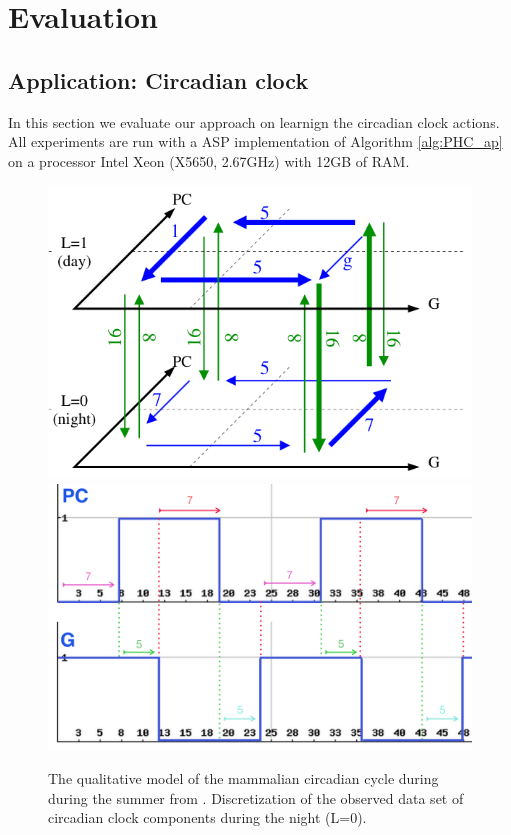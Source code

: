 \section{Evaluation}
\label{sec:evaluation}
\subsection{Application: Circadian clock}

In this section we evaluate our approach on learnign the circadian clock actions.
All experiments are run with a ASP implementation of Algorithm \ref{alg:PHC_ap} on a processor Intel Xeon (X5650, 2.67GHz) with 12GB of RAM.

\begin{figure}
\begin{center}
\includegraphics[width=0.4\linewidth]{images/circadianClock-summer.png}
\includegraphics[width=0.4\linewidth]{images/circadianClock-Courb.png}
\end{center}
\caption{The qualitative model of the mammalian circadian cycle during during the summer from \cite{comet2010formal}. Discretization of the observed data set of circadian clock components during the night (L=0).}
\end{figure}

